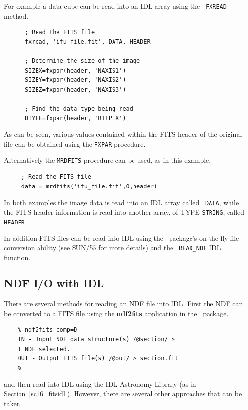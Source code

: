 \documentclass[twoside,11pt]{article}
\newcommand{\htmladdnormallink}[2]{#1}
\newcommand{\xref}[3]{#1}
\newcommand{\xlabel}[1]{}
\newcommand{\latex}[1]{#1}
\begin{document}
For example a data cube can be read into an IDL array using the {\tt
FXREAD} method.

\small\begin{verbatim}
      ; Read the FITS file
      fxread, 'ifu_file.fit', DATA, HEADER
 
      ; Determine the size of the image
      SIZEX=fxpar(header, 'NAXIS1')
      SIZEY=fxpar(header, 'NAXIS2')
      SIZEZ=fxpar(header, 'NAXIS3')
 
      ; Find the data type being read
      DTYPE=fxpar(header, 'BITPIX')
\end{verbatim}\normalsize

As can be seen, various values contained within the FITS header of the
original file can be obtained using the {\tt FXPAR} procedure.

Alternatively the {\tt MRDFITS} procedure can be used, as in this
example.

\small\begin{verbatim}
     ; Read the FITS file
     data = mrdfits('ifu_file.fit',0,header)
\end{verbatim}\normalsize

In both examples the image data is read into an IDL array called {\tt
DATA}, while the FITS header information is read into another array,
of TYPE {\tt STRING}, called {\tt HEADER}.

In addition FITS files can be read into IDL using the
\CONVERTref\normalsize\ package's \xref{on-the-fly file conversion}{sun55}{sect_auto}
ability\latex{ (see SUN/55 for more details)} and the \xref{{\tt
READ\_NDF}}{sun55}{READ_NDF} IDL function.
 
\subsection{\xlabel{sc16_ndfidl}NDF I/O with IDL\label{sc16_ndfidl}}

There are several methods for reading an \xref{NDF}{sun33}{} file into
IDL.  First the NDF can be converted to a FITS file using the
\xref{{\bf ndf2fits}}{sun55}{NDF2FITS} application in the \CONVERTref\
package,

\small\begin{verbatim}
    % ndf2fits comp=D
    IN - Input NDF data structure(s) /@section/ > 
    1 NDF selected.
    OUT - Output FITS file(s) /@out/ > section.fit
    %
\end{verbatim}\normalsize

and then read into IDL using the \htmladdnormallink{IDL Astronomy
Library}{http://idlastro.gsfc.nasa.gov/homepage.html}\latex{ (as
in Section~\ref{sc16_fitsidl})}.  However, there are several other
approaches that can be taken.
\end{document}
